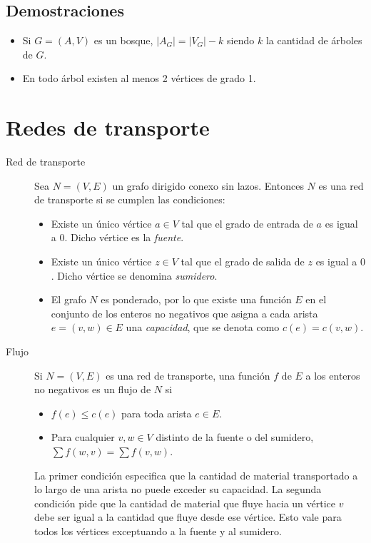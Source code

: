 \documentclass[a4paper, twoside]{article}
\begin{document}
\subsection{Demostraciones}
\begin{itemize}
	\item Si $G=(A,V)$ es un bosque, $|A_G| = |V_G| - k$ siendo $k$ la cantidad de árboles de $G$.
	\item En todo árbol existen al menos 2 vértices de grado 1.
\end{itemize}

\newpage
\section{Redes de transporte}
\begin{description}
	\item[Red de transporte] Sea $N = (V,E)$ un grafo dirigido conexo sin lazos. 
	Entonces $N$ es una red de transporte si se cumplen las condiciones:
	
	\begin{itemize}
		\item Existe un único vértice $a \in V$ tal que el grado de entrada de $a$ es igual a $0$. Dicho vértice es la \emph{fuente}.

		\item Existe un único vértice $z \in V$ tal que el grado de salida de $z$ es igual a $0$. Dicho vértice se denomina \emph{sumidero}.

		\item El grafo $N$ es ponderado, por lo que existe una función $E$ en el conjunto de los enteros no negativos que asigna a cada arista $e = (v,w) \in E$ una \emph{capacidad}, que se denota como $c(e) = c(v,w)$.
	\end{itemize}

	\item[Flujo] Si $N = (V,E)$ es una red de transporte, una función $f$ de $E$ a los enteros no negativos es un flujo de $N$ si
	\begin{itemize}
		\item $f(e) \le c(e)$ para toda arista $e \in E$.
		\item Para cualquier $v,w \in V$ distinto de la fuente o del sumidero, $\sum f(w,v) = \sum f(v,w)$.
	\end{itemize}

	La primer condición especifica que la cantidad de material transportado a lo largo de una arista no puede exceder su capacidad.
	La segunda condición pide que la cantidad de material que fluye hacia un vértice $v$ debe ser igual a la cantidad que fluye desde ese vértice.
	Esto vale para todos los vértices exceptuando a la fuente y al sumidero.


\end{description}
\end{document}
